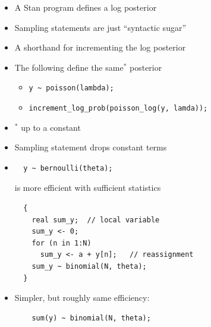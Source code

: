 \documentclass[10pt]{report}
\begin{document}
%
\begin{itemize}
\item A Stan program defines a log posterior
\item Sampling statements are just ``syntactic sugar''
\item A shorthand for incrementing the log posterior
\item The following define the same$^*$ posterior
\begin{itemize}
\item \Verb|y ~ poisson(lambda);|
\item \Verb|increment_log_prob(poisson_log(y, lamda));|
\end{itemize}
\item ${}^{*}$ up to a constant
\item Sampling statement drops constant terms
\end{itemize}


%
\begin{itemize}
\item
\begin{Verbatim}
  y ~ bernoulli(theta);
\end{Verbatim}
is more efficient with sufficient statistics
{\small
\begin{Verbatim}
  {
    real sum_y;  // local variable
    sum_y <- 0;
    for (n in 1:N)
      sum_y <- a + y[n];   // reassignment
    sum_y ~ binomial(N, theta);
  }
\end{Verbatim}
}
\item Simpler, but roughly same efficiency:
\begin{Verbatim}
    sum(y) ~ binomial(N, theta);
\end{Verbatim}
\end{itemize}
\end{document}
